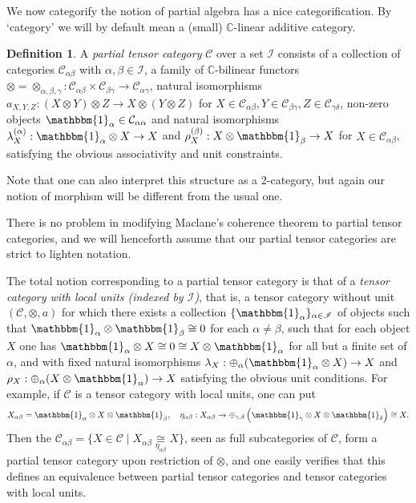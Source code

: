 \documentclass[10pt]{article}
\newcommand{\C}{\mathbb{C}}
\newcommand{\CatC}{\mathcal{C}}
\newcommand{\CatCC}{\mathscr{C}}
\newcommand{\Unitb}{\mathbbm{1}}
\theoremstyle{definition}
\newtheorem{Def}[Theorem]{Definition}
\numberwithin{equation}{section}
\begin{document}
We now categorify the notion of partial algebra has a nice categorification. By `category' we will by default mean a (small) $\C$-linear additive category. 

\begin{Def} A \emph{partial tensor category} $\CatCC$ over a set $\mathscr{I}$ consists of  a collection of categories $\mathcal{C}_{\alpha\beta}$ with $\alpha,\beta\in \mathscr{I}$, a family of $\C$-bilinear functors $\otimes = \otimes_{\alpha,\beta,\gamma}: \CatC_{\alpha\beta}\times \CatC_{\beta\gamma}\rightarrow \CatC_{\alpha\gamma}$, natural isomorphisms $a_{X,Y,Z}: (X\otimes Y)\otimes Z \rightarrow X\otimes (Y\otimes Z)$ for $X \in \CatC_{\alpha\beta},Y\in \CatC_{\beta\gamma},Z\in \CatC_{\gamma\delta}$, non-zero objects $\Unitb_{\alpha} \in \CatC_{\alpha\alpha}$ and natural isomorphisms $\lambda_X^{(\alpha)}:\Unitb_\alpha\otimes X \rightarrow X$ and $\rho_X^{(\beta)}:X\otimes \Unitb_\beta\rightarrow X$ for $X\in \CatC_{\alpha\beta}$, satisfying the obvious associativity and unit constraints. 
\end{Def}

Note that one can also interpret this structure as a 2-category, but again our notion of morphism will be different from the usual one.

There is no problem in modifying Maclane's coherence theorem to partial tensor categories, and we will henceforth assume that our partial tensor categories are strict to lighten notation. 

The total notion corresponding to a partial tensor category is that of a \emph{tensor category with local units (indexed by $\mathscr{I}$)}, that is, a tensor category without unit $(\CatC,\otimes,a)$  for which there exists a collection $\{\Unitb_\alpha\}_{\alpha\in \mathscr{I}}$ of objects such that $\Unitb_\alpha\otimes \Unitb_\beta \cong 0$ for each $\alpha\neq \beta$, such that for each object $X$ one has $\Unitb_\alpha\otimes X \cong 0 \cong X\otimes \Unitb_\alpha$ for all but a finite set of $\alpha$, and with fixed natural isomorphisms $\lambda_X:\oplus_\alpha (\Unitb_\alpha\otimes X) \rightarrow X$ and $\rho_X:\oplus_\alpha(X\otimes \Unitb_\alpha)\rightarrow X$ satisfying the obvious unit conditions. For example, if $\CatC$ is a tensor category with local units, one can put \[X_{\alpha\beta} = \Unitb_\alpha\otimes X \otimes \Unitb_\beta, \quad \eta_{\alpha\beta}:X_{\alpha\beta} \rightarrow \oplus_{\gamma,\delta} \left(\Unitb_\gamma \otimes X \otimes \Unitb_\delta\right) \cong X.\]  Then the $\CatC_{\alpha\beta} = \{X \in \CatC\mid X_{\alpha\beta} \underset{\eta_{\alpha\beta}}{\cong} X\}$, seen as full subcategories of $\CatC$, form a partial tensor category upon restriction of $\otimes$, and one easily verifies that this defines an equivalence between partial tensor categories and tensor categories with local units. 
\end{document}

